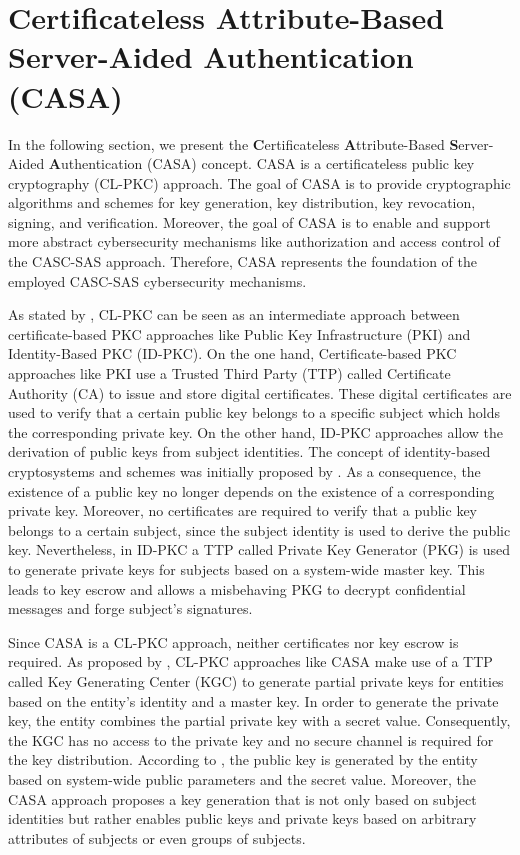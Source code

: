 \section{Certificateless Attribute-Based Server-Aided Authentication (CASA)}
\label{sec:approach:casa}
In the following section, we present the \textbf{C}ertificateless \textbf{A}ttribute-Based \textbf{S}erver-Aided \textbf{A}uthentication (CASA) concept.
CASA is a certificateless public key cryptography (CL-PKC) approach.
The goal of CASA is to provide cryptographic algorithms and schemes for key generation, key distribution, key revocation, signing, and verification.
Moreover, the goal of CASA is to enable and support more abstract cybersecurity mechanisms like authorization and access control of the CASC-SAS approach.
Therefore, CASA represents the foundation of the employed CASC-SAS cybersecurity mechanisms.

As stated by \citeauthor{AlRiyami2003} \cite{AlRiyami2003}, CL-PKC can be seen as an intermediate approach between certificate-based PKC approaches like Public Key Infrastructure (PKI) and Identity-Based PKC (ID-PKC).
On the one hand, Certificate-based PKC approaches like PKI use a Trusted Third Party (TTP) called Certificate Authority (CA) to issue and store digital certificates.
These digital certificates are used to verify that a certain public key belongs to a specific subject which holds the corresponding private key.
On the other hand, ID-PKC approaches allow the derivation of public keys from subject identities.
The concept of identity-based cryptosystems and schemes was initially proposed by \citeauthor{Shamir1985} \cite{Shamir1985}.
As a consequence, the existence of a public key no longer depends on the existence of a corresponding private key.
Moreover, no certificates are required to verify that a public key belongs to a certain subject, since the subject identity is used to derive the public key.
Nevertheless, in ID-PKC a TTP called Private Key Generator (PKG) is used to generate private keys for subjects based on a system-wide master key.
This leads to key escrow and allows a misbehaving PKG to decrypt confidential messages and forge subject's signatures.

Since CASA is a CL-PKC approach, neither certificates nor key escrow is required.
As proposed by \citeauthor{AlRiyami2003} \cite{AlRiyami2003}, CL-PKC approaches like CASA make use of a TTP called Key Generating Center (KGC) to generate partial private keys for entities based on the entity's identity and a master key.
In order to generate the private key, the entity combines the partial private key with a secret value.
Consequently, the KGC has no access to the private key and no secure channel is required for the key distribution.
According to \citeauthor{AlRiyami2003}, the public key is generated by the entity based on system-wide public parameters and the secret value.
Moreover, the CASA approach proposes a key generation that is not only based on subject identities but rather enables public keys and private keys based on arbitrary attributes of subjects or even groups of subjects.

